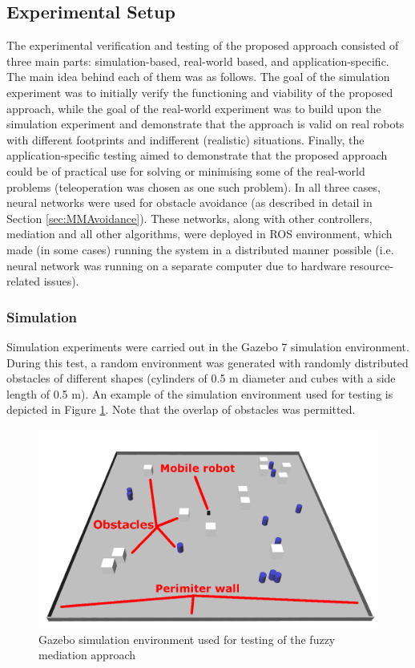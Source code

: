 \subsection{Experimental Setup}
\label{sec:MediationExperiment}

The experimental verification and testing of the proposed approach consisted of three main parts: simulation-based, real-world based, and application-specific. The main idea behind each of them was as follows. The goal of the simulation experiment was to initially verify the functioning and viability of the proposed approach, while the goal of the real-world experiment was to build upon the simulation experiment and demonstrate that the approach is valid on real robots with different footprints and indifferent (realistic) situations. Finally, the application-specific testing aimed to demonstrate that the proposed approach could be of practical use for solving or minimising some of the real-world problems (teleoperation was chosen as one such problem). 
In all three cases, neural networks were used for obstacle avoidance (as described in detail in Section \ref{sec:MMAvoidance}). These networks, along with other controllers, mediation and all other algorithms, were deployed in ROS environment, which made (in some cases) running the system in a distributed manner possible (i.e. neural network was running on a separate computer due to hardware resource-related issues).

\subsubsection{Simulation} \label{sec:MediationSimulation}
Simulation experiments were carried out in the Gazebo 7 simulation environment. During this test, a random environment was generated with randomly distributed obstacles of different shapes (cylinders of 0.5 m diameter and cubes with a side length of 0.5 m). An example of the simulation environment used for testing is depicted in Figure \ref{Fig:Gazebo3D}. Note that the overlap of obstacles was permitted.

\begin{figure}
\centering
\includegraphics[width=0.7\columnwidth]{slike/ex_simulation.png}
\caption{Gazebo simulation environment used for testing of the fuzzy mediation approach}
\label{Fig:Gazebo3D}
\end{figure}

